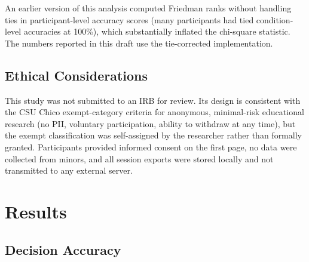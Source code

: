 \documentclass{article}
\begin{document}
An earlier version of this analysis computed Friedman ranks without
handling ties in participant-level accuracy scores (many participants
had tied condition-level accuracies at 100\%), which substantially
inflated the chi-square statistic.  The numbers reported in this
draft use the tie-corrected implementation.

\subsection{Ethical Considerations}

This study was not submitted to an IRB for review.  Its design is
consistent with the CSU Chico exempt-category criteria for anonymous,
minimal-risk educational research (no PII, voluntary participation,
ability to withdraw at any time), but the exempt classification was
self-assigned by the researcher rather than formally granted.
Participants provided informed consent on the first page, no data
were collected from minors, and all session exports were stored
locally and not transmitted to any external server.

\section{Results}

\subsection{Decision Accuracy}
\end{document}

